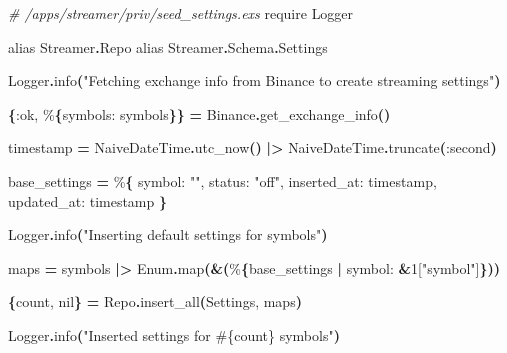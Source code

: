 \documentclass[
  oneside]{book}
\newenvironment{Shaded}{\begin{snugshade}}{\end{snugshade}}
\newcommand{\CommentTok}[1]{\textcolor[rgb]{0.56,0.35,0.01}{\textit{#1}}}
\newcommand{\ConstantTok}[1]{\textcolor[rgb]{0.56,0.35,0.01}{#1}}
\newcommand{\DecValTok}[1]{\textcolor[rgb]{0.00,0.00,0.81}{#1}}
\newcommand{\FunctionTok}[1]{\textcolor[rgb]{0.13,0.29,0.53}{\textbf{#1}}}
\newcommand{\ImportTok}[1]{#1}
\newcommand{\NormalTok}[1]{#1}
\newcommand{\OperatorTok}[1]{\textcolor[rgb]{0.81,0.36,0.00}{\textbf{#1}}}
\newcommand{\OtherTok}[1]{\textcolor[rgb]{0.56,0.35,0.01}{#1}}
\newcommand{\StringTok}[1]{\textcolor[rgb]{0.31,0.60,0.02}{#1}}
\newcommand{\VariableTok}[1]{\textcolor[rgb]{0.00,0.00,0.00}{#1}}
\begin{document}
\begin{Shaded}
\begin{Highlighting}[]
\CommentTok{\# /apps/streamer/priv/seed\_settings.exs}
\ImportTok{require} \ConstantTok{Logger}

\ImportTok{alias} \ConstantTok{Streamer}\OperatorTok{.}\ConstantTok{Repo}
\ImportTok{alias} \ConstantTok{Streamer}\OperatorTok{.}\ConstantTok{Schema}\OperatorTok{.}\ConstantTok{Settings}

\ConstantTok{Logger}\OperatorTok{.}\NormalTok{info}\FunctionTok{(}\StringTok{"Fetching exchange info from Binance to create streaming settings"}\FunctionTok{)}

\FunctionTok{\{}\VariableTok{:ok}\NormalTok{, \%}\FunctionTok{\{}\VariableTok{symbols:}\NormalTok{ symbols}\FunctionTok{\}\}} \OperatorTok{=} \ConstantTok{Binance}\OperatorTok{.}\NormalTok{get\_exchange\_info}\FunctionTok{()}

\NormalTok{timestamp }\OperatorTok{=} \ConstantTok{NaiveDateTime}\OperatorTok{.}\NormalTok{utc\_now}\FunctionTok{()}
  \OperatorTok{|\textgreater{}} \ConstantTok{NaiveDateTime}\OperatorTok{.}\NormalTok{truncate}\FunctionTok{(}\VariableTok{:second}\FunctionTok{)}

\NormalTok{base\_settings }\OperatorTok{=}\NormalTok{ \%}\FunctionTok{\{}
  \VariableTok{symbol:} \StringTok{""}\NormalTok{,}
  \VariableTok{status:} \StringTok{"off"}\NormalTok{,}
  \VariableTok{inserted\_at:}\NormalTok{ timestamp,}
  \VariableTok{updated\_at:}\NormalTok{ timestamp}
\FunctionTok{\}}

\ConstantTok{Logger}\OperatorTok{.}\NormalTok{info}\FunctionTok{(}\StringTok{"Inserting default settings for symbols"}\FunctionTok{)}

\NormalTok{maps }\OperatorTok{=}\NormalTok{ symbols}
  \OperatorTok{|\textgreater{}} \ConstantTok{Enum}\OperatorTok{.}\NormalTok{map}\FunctionTok{(}\OperatorTok{\&}\FunctionTok{(}\NormalTok{\%}\FunctionTok{\{}\NormalTok{base\_settings }\OperatorTok{|} \VariableTok{symbol:} \OperatorTok{\&}\DecValTok{1}\OtherTok{[}\StringTok{"symbol"}\OtherTok{]}\FunctionTok{\}))}

\FunctionTok{\{}\NormalTok{count, }\ConstantTok{nil}\FunctionTok{\}} \OperatorTok{=} \ConstantTok{Repo}\OperatorTok{.}\NormalTok{insert\_all}\FunctionTok{(}\ConstantTok{Settings}\NormalTok{, maps}\FunctionTok{)}

\ConstantTok{Logger}\OperatorTok{.}\NormalTok{info}\FunctionTok{(}\StringTok{"Inserted settings for }\OtherTok{\#\{}\NormalTok{count}\OtherTok{\}}\StringTok{ symbols"}\FunctionTok{)}
\end{Highlighting}
\end{Shaded}
\end{document}
